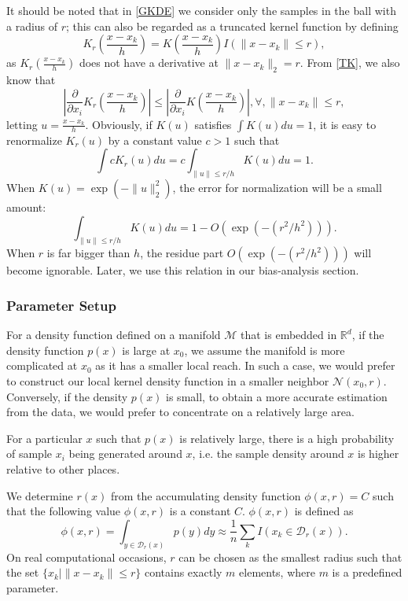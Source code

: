 \documentclass[aos,preprint]{imsart}
\theoremstyle{remark}
\begin{document}
It should be noted that in \eqref{GKDE} we consider only the samples in the ball with a radius of $r$; this can also be regarded as a truncated kernel function by defining
\begin{equation}\label{TK}
K_r(\frac{x-x_k}{h}) = K(\frac{x-x_k}{h}) I(\|x -x_k\|\leq r),
\end{equation}
as $K_r(\frac{x-x_k}{h})$ does not have a derivative at $\|x-x_k\|_2=r$. From \eqref{TK}, we also know that
\begin{equation}\label{DTK}
|\frac{\partial}{\partial x_i} K_r(\frac{x-x_k}{h}) | \leq |\frac{\partial}{\partial x_i} K(\frac{x-x_k}{h})|, \forall, \|x-x_k\|\leq r,
\end{equation}
letting $u = \frac{x-x_k}{h}$. Obviously, if $K(u)$ satisfies $\int K(u)du=1$, it is easy to renormalize $K_r(u)$ by a constant value $c>1$ such that
\[
\int c K_r (u) du =  c\int_{\|u\|\leq r/h} K(u) du= 1.
\]
When $K(u) = \exp(-\|u\|^2_2)$, the error for normalization will be a small amount:
\begin{equation}\label{Perror}
 \int_{\|u\|\leq r/h} K(u) du =1- O(\exp(-(r^2/h^2))).
\end{equation}
When $r$ is far bigger than $h$, the residue part $O(\exp(-(r^2/h^2)))$ will become ignorable. Later, we use this relation in our bias-analysis section.
\subsubsection{Parameter Setup}
For a density function defined on a manifold $\mathcal M$ that is embedded in $\mathbb{R}^d$, if the density function $p(x)$ is large at $x_0$, we assume the manifold is more complicated at $x_0$ as it has a smaller local reach. In such a case, we would prefer to construct our local kernel density function in a smaller neighbor ${\mathcal N}(x_0,r)$. Conversely, if the density $p(x)$ is small, to obtain a more accurate estimation from the data, we would prefer to concentrate on a relatively large area.

For a particular $x$ such that $p(x)$ is relatively large, there is a high probability of sample $x_i$ being generated around $x$, i.e. the sample density around $x$ is higher relative to other places.

We determine $r(x)$ from the accumulating density function $\phi(x,r)=C$ such that the following value $\phi(x,r) $ is a constant $C$. $\phi(x,r)$ is defined as
\[
\phi(x,r) = \int_{y\in {\mathcal D}_r(x)} p(y) dy \approx \frac{1}{n} \sum_k I(x_k\in {\mathcal D}_r(x)).
\]
On real computational occasions, $r$ can be chosen as the smallest radius such that the set $\{x_k| \|x-x_k\|\leq r\}$ contains exactly $m$ elements, where $m$ is a predefined parameter.
\end{document}
